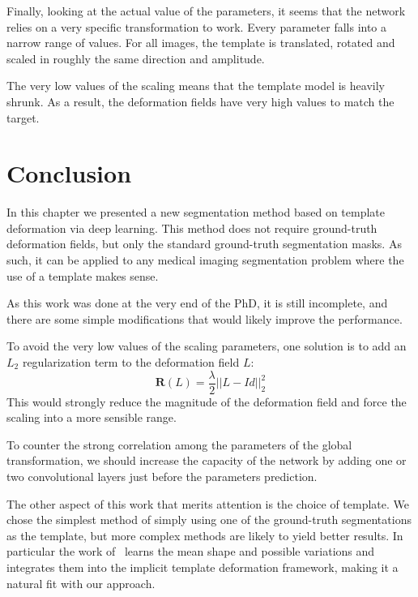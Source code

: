 Finally, looking at the actual value of the parameters, it seems that the network relies on a very specific transformation to work. Every parameter falls into a narrow range of values. For all images, the template is translated, rotated and scaled in roughly the same direction and amplitude. 

The very low values of the scaling means that the template model is heavily shrunk. As a result, the deformation fields have very high values to match the target. %



\section{Conclusion}

In this chapter we presented a new segmentation method based on template deformation via deep learning. This method does not require ground-truth deformation fields, but only the standard ground-truth segmentation masks. As such, it can be applied to any medical imaging segmentation problem where the use of a template makes sense.

As this work was done at the very end of the PhD, it is still incomplete, and there are some simple modifications that would likely improve the performance. 

To avoid the very low values of the scaling parameters, one solution is to add an $L_2$ regularization term to the deformation field $L$:
\begin{equation}
    \mathbf{R} \left( L \right) = \frac{\lambda}{2} || L - Id ||^2_2
\end{equation}
This would strongly reduce the magnitude of the deformation field and force the scaling into a more sensible range. 

To counter the strong correlation among the parameters of the global transformation, we should increase the capacity of the network by adding one or two convolutional layers just before the parameters prediction.

The other aspect of this work that merits attention is the choice of template. We chose the simplest method of simply using one of the ground-truth segmentations as the template, but more complex methods are likely to yield better results. In particular the work of~\textcite{prevost2013PHD} learns the mean shape and possible variations and integrates them into the implicit template deformation framework, making it a natural fit with our approach.

